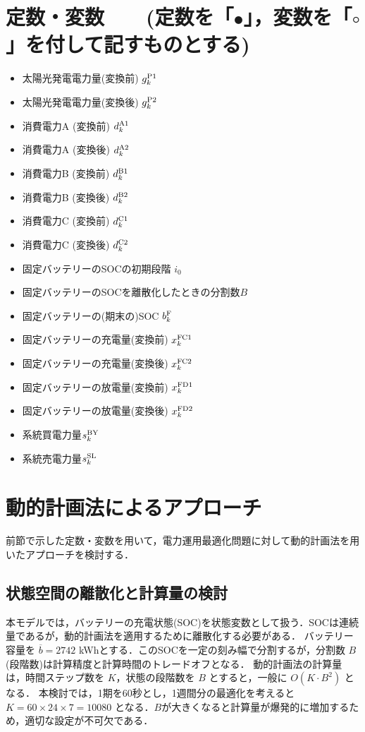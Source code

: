 \documentclass{jarticle}
\newcommand{\IB}{$\bullet$}
\newcommand{\IC}{$\circ$}
\begin{document}
\section{定数・変数 \mbox{\normalsize\rm
~ (定数を「\IB」，変数を「\IC」を付して記すものとする)}}

 \begin{itemize}
  \item[\IB] 太陽光発電電力量(変換前) $g^{\rm P1}_{k}$
  \item[\IC] 太陽光発電電力量(変換後) $g^{\rm P2}_{k}$
  \item[\IC] 消費電力A (変換前) $d^{\rm A1}_{k}$
  \item[\IB] 消費電力A (変換後) $d^{\rm A2}_{k}$
  \item[\IC] 消費電力B (変換前) $d^{\rm B1}_{k}$
  \item[\IB] 消費電力B (変換後) $d^{\rm B2}_{k}$
  \item[\IC] 消費電力C (変換前) $d^{\rm C1}_{k}$
  \item[\IB] 消費電力C (変換後) $d^{\rm C2}_{k}$
  \item[\IB] 固定バッテリーのSOCの初期段階 $i_{0}$
  \item[\IB] 固定バッテリーのSOCを離散化したときの分割数$B$
  \item[\IC] 固定バッテリーの(期末の)SOC $b^{\rm F}_{k}$
  \item[\IC] 固定バッテリーの充電量(変換前) $x^{\rm FC1}_{k}$
  \item[\IC] 固定バッテリーの充電量(変換後) $x^{\rm FC2}_{k}$
  \item[\IC] 固定バッテリーの放電量(変換前) $x^{\rm FD1}_{k}$
  \item[\IC] 固定バッテリーの放電量(変換後) $x^{\rm FD2}_{k}$ \\[-2.5ex]
  \item[\IC] 系統買電力量$s^{\rm BY}_{k}$
  \item[\IC] 系統売電力量$s^{\rm SL}_{k}$
 \end{itemize}


\section{動的計画法によるアプローチ}

前節で示した定数・変数を用いて，電力運用最適化問題に対して動的計画法を用いたアプローチを検討する．

\subsection{状態空間の離散化と計算量の検討}
本モデルでは，バッテリーの充電状態(SOC)を状態変数として扱う．SOCは連続量であるが，動的計画法を適用するために離散化する必要がある．
バッテリー容量を $\overline{b} = 2742$ kWhとする．このSOCを一定の刻み幅で分割するが，分割数 $B$ (段階数)は計算精度と計算時間のトレードオフとなる．
動的計画法の計算量は，時間ステップ数を $K$，状態の段階数を $B$ とすると，一般に $O(K \cdot B^2)$ となる．
本検討では，1期を60秒とし，1週間分の最適化を考えると $K = 60 \times 24 \times 7 = 10080$ となる．$B$が大きくなると計算量が爆発的に増加するため，適切な設定が不可欠である．
\end{document}

